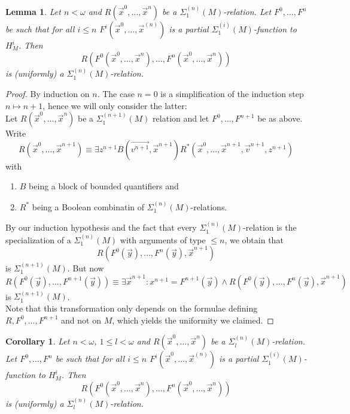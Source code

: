 \documentclass[12pt,a4paper]{article}
\theoremstyle{nicestyle}
\newtheorem{lemma}{Lemma}[subsection]
\newtheorem{corollary}{Corollary}[subsection]
\begin{document}
\begin{lemma}
  Let $n < \omega$ and $R(\vec{x}^{0}, \ldots, \vec{x}^n)$ be a
  $\Sigma^{(n)}_1(M)$-relation. Let $F^0, \ldots, F^{n}$ be such that
  for all $i \le n$ $F^i(\vec{x}^{0}, \ldots, \vec{x}^{(n)})$ is a
  partial $\Sigma^{(i)}_1(M)$-function to $H^i_{M}$. Then
  \[
    R(F^{0}(\vec{x}^{0}, \ldots, \vec{x}^{n}), \ldots,
    F^{n}(\vec{x}^{0}, \ldots, \vec{x}^n))
  \]
  is (uniformly) a $\Sigma^{(n)}_1(M)$-relation.
\end{lemma}

\begin{proof}
  By induction on $n$. The case $n=0$ is a simplification of the induction step
  $n \mapsto n+1$, hence we will only consider the latter: \\

  Let $R(\vec{x}^{0}, \ldots, \vec{x}^n)$ be a $\Sigma^{(n+1)}_1(M)$ relation and let $F^0, \ldots, F^{n+1}$ be as above. Write
  \[
    R(\vec{x}^{0}, \ldots, \vec{x}^{n+1}) \equiv \exists z^{n+1}
    B(\vec{v^{n+1}}, \vec{x}^{n+1}) R^{*}(\vec{x}^{0}, \ldots,
    \vec{x}^{n+1}, \vec{v}^{n+1}, z^{n+1})
  \]
  with
  \begin{enumerate}
  \item $B$ being a block of bounded quantifiers and
  \item $R^{*}$ being a Boolean combinatin of $\Sigma^{(n)}_1(M)$-relations.
  \end{enumerate}
  By our induction hypothesis and the fact that every
  $\Sigma^{(n)}_1(M)$-relation is the specialization of a
  $\Sigma^{(n)}_1(M)$ with arguments of type $\le n$, we obtain that
  \[
    R(F^{0}(\vec{y}), \ldots, F^{n}(\vec{y}), \vec{x}^{n+1})
  \]
  is $\Sigma^{(n+1)}_1(M)$. But now
  \[
    R(F^{0}(\vec{y}), \ldots, F^{n+1}(\vec{y})) \equiv \exists
    \vec{x}^{n+1} \colon x^{n+1} = F^{n+1}(\vec{y}) \wedge
    R(F^{0}(\vec{y}), \ldots, F^{n}(\vec{y}), \vec{x}^{n+1})
  \]
  is $\Sigma^{(n+1)}_1(M)$. \\
  Note that this transformation only depends on the formulae defining
  $R, F^0, \ldots, F^{n+1}$ and not on $M$, which yields the uniformity we
  claimed.
\end{proof}

\begin{corollary} \label{cor:closure under functions} Let
  $n < \omega$, $1 \le l < \omega$ and
  $R(\vec{x}^{0}, \ldots, \vec{x}^n)$ be a
  $\Sigma^{(n)}_l(M)$-relation. Let $F^0, \ldots, F^{n}$ be such that
  for all $i \le n$ $F^i(\vec{x}^{0}, \ldots, \vec{x}^{(n)})$ is a
  partial $\Sigma^{(i)}_1(M)$-function to $H^i_{M}$. Then
  \[
    R(F^{0}(\vec{x}^{0}, \ldots, \vec{x}^{n}), \ldots,
    F^{n}(\vec{x}^{0}, \ldots, \vec{x}^n))
  \]
  is (uniformly) a $\Sigma^{(n)}_l(M)$-relation.
\end{corollary}
\end{document}
